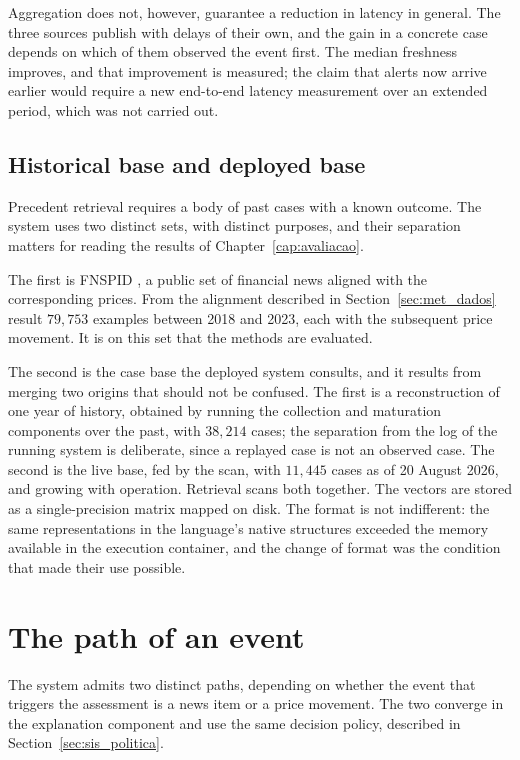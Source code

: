 Aggregation does not, however, guarantee a reduction in latency in general. The three sources
publish with delays of their own, and the gain in a concrete case depends on which of them observed
the event first. The median freshness improves, and that improvement is measured; the claim that
alerts now arrive earlier would require a new end-to-end latency measurement over an extended
period, which was not carried out.

\subsection{Historical base and deployed base}
\label{sec:sis_bases}

Precedent retrieval requires a body of past cases with a known outcome. The system uses two
distinct sets, with distinct purposes, and their separation matters for reading the results of
Chapter~\ref{cap:avaliacao}.

The first is \gls{FNSPID} \autocite{dong2024fnspid}, a public set of financial news aligned with
the corresponding prices. From the alignment described in Section~\ref{sec:met_dados} result
$79{,}753$ examples between 2018 and 2023, each with the subsequent price movement. It is on this
set that the methods are evaluated.

The second is the case base the deployed system consults, and it results from merging two origins
that should not be confused. The first is a reconstruction of one year of history, obtained by
running the collection and maturation components over the past, with $38{,}214$ cases; the
separation from the log of the running system is deliberate, since a replayed case is not an
observed case. The second is the live base, fed by the scan, with $11{,}445$ cases as of 20 August 2026, and
growing with operation. Retrieval scans
both together. The vectors are stored as a single-precision matrix mapped on disk. The format is
not indifferent: the same representations in the language's native structures exceeded the memory
available in the execution container, and the change of format was the condition that made their
use possible.

\section{The path of an event}
\label{sec:sis_percurso}

The system admits two distinct paths, depending on whether the event that triggers the assessment
is a news item or a price movement. The two converge in the explanation component and use the same
decision policy, described in Section~\ref{sec:sis_politica}.

